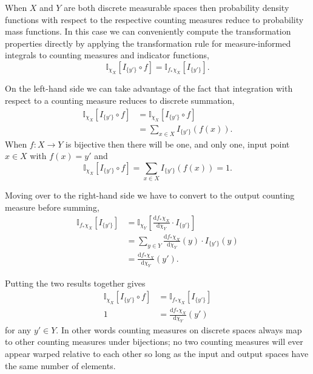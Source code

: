 \documentclass[
  letterpaper,
  DIV=11,
  numbers=noendperiod]{scrartcl}
\begin{document}
When \(X\) and \(Y\) are both discrete measurable spaces then
probability density functions with respect to the respective counting
measures reduce to probability mass functions. In this case we can
conveniently compute the transformation properties directly by applying
the transformation rule for measure-informed integrals to counting
measures and indicator functions, \[
\mathbb{I}_{ \chi_{X} } [ I_{ \{ y' \} } \circ f ]
=
\mathbb{I}_{ f_{*} \chi_{X} } [ I_{ \{ y' \} } ].
\]

On the left-hand side we can take advantage of the fact that integration
with respect to a counting measure reduces to discrete summation,
\begin{align*}
\mathbb{I}_{ \chi_{X} } [ I_{ \{ y' \} } \circ f ]
&=
\mathbb{I}_{\chi_{X}} \left[ I_{ \{ y' \} } \circ f \right]
\\
&=
\sum_{x \in X} I_{ \{ y' \} }(f(x)).
\end{align*} When \(f : X \rightarrow Y\) is bijective then there will
be one, and only one, input point \(x \in X\) with \(f(x) = y'\) and \[
\mathbb{I}_{ \chi_{X} } [ I_{ \{ y' \} } \circ f ]
=
\sum_{x \in X} I_{ \{ y' \} }(f(x))
=
1.
\]

Moving over to the right-hand side we have to convert to the output
counting measure before summing, \begin{align*}
\mathbb{I}_{ f_{*} \chi_{X} } [ I_{ \{ y' \} } ]
&=
\mathbb{I}_{\chi_{Y}} \left[
\frac{ \mathrm{d} f_{*} \chi_{X} }{ \mathrm{d} \chi_{Y} }
\cdot I_{ \{ y' \} }
\right]
\\
&=
\sum_{y \in Y}
\frac{ \mathrm{d} f_{*} \chi_{X} }{ \mathrm{d} \chi_{Y} }(y)
\cdot I_{ \{ y' \} }(y)
\\
&=
\frac{ \mathrm{d} f_{*} \chi_{X} }{ \mathrm{d} \chi_{Y} }(y').
\end{align*}

Putting the two results together gives \begin{align*}
\mathbb{I}_{ \chi_{X} } [ I_{ \{ y' \} } \circ f ]
&=
\mathbb{I}_{ f_{*} \chi_{X} } [ I_{ \{ y' \} } ]
\\
1
&=
\frac{ \mathrm{d} f_{*} \chi_{X} }{ \mathrm{d} \chi_{Y} }(y')
\end{align*} for any \(y' \in Y\). In other words counting measures on
discrete spaces always map to other counting measures under bijections;
no two counting measures will ever appear warped relative to each other
so long as the input and output spaces have the same number of elements.
\end{document}
